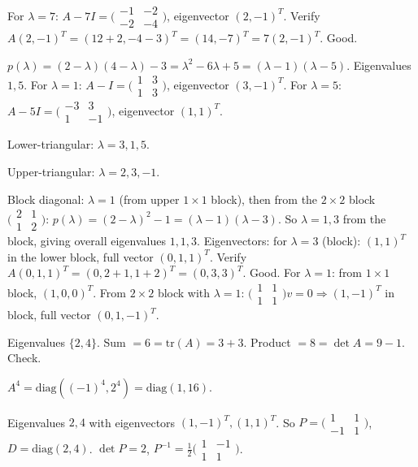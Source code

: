 \begin{solutions}
  For $\lambda = 7$: $A - 7 I = \bigl(\begin{smallmatrix} -1 & -2 \\ -2 & -4 \end{smallmatrix}\bigr)$, eigenvector $(2, -1)^{T}$. Verify $A(2, -1)^{T} = (12 + 2, -4 - 3)^{T} = (14, -7)^{T} = 7(2, -1)^{T}$. Good.
  \item $p(\lambda) = (2 - \lambda)(4 - \lambda) - 3 = \lambda^{2} - 6 \lambda + 5 = (\lambda - 1)(\lambda - 5)$. Eigenvalues $1, 5$.
  For $\lambda = 1$: $A - I = \bigl(\begin{smallmatrix} 1 & 3 \\ 1 & 3 \end{smallmatrix}\bigr)$, eigenvector $(3, -1)^{T}$.
  For $\lambda = 5$: $A - 5 I = \bigl(\begin{smallmatrix} -3 & 3 \\ 1 & -1 \end{smallmatrix}\bigr)$, eigenvector $(1, 1)^{T}$.
  \item Lower-triangular: $\lambda = 3, 1, 5$.
  \item Upper-triangular: $\lambda = 2, 3, -1$.
  \item Block diagonal: $\lambda = 1$ (from upper $1 \times 1$ block), then from the $2 \times 2$ block $\bigl(\begin{smallmatrix} 2 & 1 \\ 1 & 2 \end{smallmatrix}\bigr)$: $p(\lambda) = (2 - \lambda)^{2} - 1 = (\lambda - 1)(\lambda - 3)$. So $\lambda = 1, 3$ from the block, giving overall eigenvalues $1, 1, 3$.
  Eigenvectors: for $\lambda = 3$ (block): $(1, 1)^{T}$ in the lower block, full vector $(0, 1, 1)^{T}$. Verify $A(0, 1, 1)^{T} = (0, 2 + 1, 1 + 2)^{T} = (0, 3, 3)^{T}$. Good. For $\lambda = 1$: from $1 \times 1$ block, $(1, 0, 0)^{T}$. From $2 \times 2$ block with $\lambda = 1$: $\bigl(\begin{smallmatrix} 1 & 1 \\ 1 & 1 \end{smallmatrix}\bigr) v = 0 \Rightarrow (1, -1)^{T}$ in block, full vector $(0, 1, -1)^{T}$.
  \item Eigenvalues $\{2, 4\}$. Sum $= 6 = \mathrm{tr}(A) = 3 + 3$. Product $= 8 = \det A = 9 - 1$. Check.
  \item $A^{4} = \mathrm{diag}((-1)^{4}, 2^{4}) = \mathrm{diag}(1, 16)$.
  \item Eigenvalues $2, 4$ with eigenvectors $(1, -1)^{T}, (1, 1)^{T}$. So $P = \bigl(\begin{smallmatrix} 1 & 1 \\ -1 & 1 \end{smallmatrix}\bigr)$, $D = \mathrm{diag}(2, 4)$. $\det P = 2$, $P^{-1} = \tfrac{1}{2}\bigl(\begin{smallmatrix} 1 & -1 \\ 1 & 1 \end{smallmatrix}\bigr)$.

\end{solutions}
